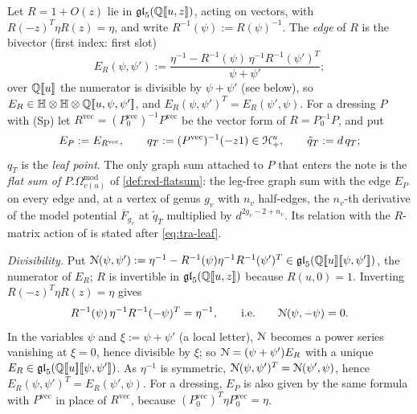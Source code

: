 \begin{defn}
\label{def:tra-edge}
Let $R = 1+O(z)$ lie in $\mathfrak{gl}_5(\mathbb{Q}[\![ u,z ]\!])$, acting on vectors, with $R(-z)^T\eta R(z) = \eta$, and write $R^{-1}(\psi) := R(\psi)^{-1}$. The \emph{edge} of $R$ is the bivector (first index: first slot)
\[
E_R(\psi,\psi') := \frac{\eta^{-1}-R^{-1}(\psi)\,\eta^{-1}R^{-1}(\psi')^T}{\psi+\psi'} ;
\]
over $\mathbb{Q}[\![ u ]\!]$ the numerator is divisible by $\psi+\psi'$ (see below), so $E_R\in\mathbb{H}\otimes\mathbb{H}\otimes\mathbb{Q}[\![ u,\psi,\psi' ]\!]$, and $E_R(\psi,\psi')^T = E_R(\psi',\psi)$. For a dressing $P$ with (Sp) let $R^{\mathrm{vec}} = (P_0^{\mathrm{vec}})^{-1}P^{\mathrm{vec}}$ be the vector form of $R = P_0^{-1}P$, and put
\[
E_P := E_{R^{\mathrm{vec}}},\qquad q_T := (P^{\mathrm{vec}})^{-1}(-z1)\in\mathcal{H}^u_+,\qquad \tilde q_T := d\,q_T ;
\]
$q_T$ is the \emph{leaf point}. The only graph sum attached to $P$ that enters the note is the \emph{flat sum of $P.\Omega^{\mathrm{mod}}_{v(u)}$} of \cref{def:red-flatsum}: the leg-free graph sum with the edge $E_P$ on every edge and, at a vertex of genus $g_v$ with $n_v$ half-edges, the $n_v$-th derivative of the model potential $\overline F_{g_v}$ at $\tilde q_T$ multiplied by $d^{2g_v-2+n_v}$. Its relation with the $R$-matrix action of \cite[Def.~2.2]{PPZ15} is stated after \eqref{eq:tra-leaf}.
\end{defn}

\emph{Divisibility.} Put $\mathcal{N}(\psi,\psi') := \eta^{-1}-R^{-1}(\psi)\eta^{-1}R^{-1}(\psi')^T\in\mathfrak{gl}_5(\mathbb{Q}[\![ u ]\!][\![ \psi,\psi' ]\!])$, the numerator of $E_R$; $R$ is invertible in $\mathfrak{gl}_5(\mathbb{Q}[\![ u,z ]\!])$ because $R(u,0) = 1$. Inverting $R(-z)^T\eta R(z) = \eta$ gives
\[
R^{-1}(\psi)\,\eta^{-1}R^{-1}(-\psi)^T = \eta^{-1},\qquad\text{i.e.}\qquad \mathcal{N}(\psi,-\psi) = 0 .
\] In the variables $\psi$ and $\xi := \psi+\psi'$ (a local letter), $\mathcal{N}$ becomes a power series vanishing at $\xi = 0$, hence divisible by $\xi$; so $\mathcal{N} = (\psi+\psi')E_R$ with a unique $E_R\in\mathfrak{gl}_5(\mathbb{Q}[\![ u ]\!][\![ \psi,\psi' ]\!])$. As $\eta^{-1}$ is symmetric, $\mathcal{N}(\psi,\psi')^T = \mathcal{N}(\psi',\psi)$, hence $E_R(\psi,\psi')^T = E_R(\psi',\psi)$. For a dressing, $E_P$ is also given by the same formula with $P^{\mathrm{vec}}$ in place of $R^{\mathrm{vec}}$, because $(P_0^{\mathrm{vec}})^T\eta P_0^{\mathrm{vec}} = \eta$.

